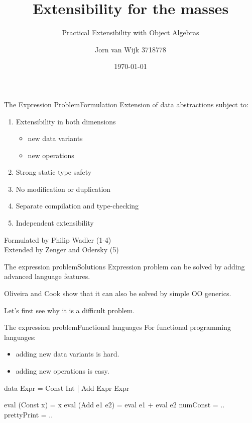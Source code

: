 \documentclass[10pt, compress]{beamer}
\title{Extensibility for the masses}
\subtitle{Practical Extensibility with Object Algebras}
\date{\today}
\author{Jorn van Wijk 3718778}
\institute{Universiteit Utrecht}
\newenvironment{slide}[1]{\begin{frame}[fragile,environment=slide]{#1}}{\end{frame}}
\newenvironment{slide}[2]{\begin{frame}[fragile,environment=slide]{#1}{#2}}{\end{frame}}
\begin{document}
\maketitle
\begin{slide}{The Expression Problem}{Formulation}
Extension of data abstractions subject to:
\begin{enumerate}
\item Extensibility in both dimensions 
	\begin{itemize}
		\item new data variants
		\item new operations
	\end{itemize}
\item Strong static type safety %
\item No modification or duplication
\item Separate compilation and type-checking
\item Independent extensibility
\end{enumerate}

Formulated by Philip Wadler (1-4)\\
Extended by Zenger and Odersky (5)
\end{slide}


\begin{slide}{The expression problem}{Solutions}
Expression problem can be solved by adding advanced language features.

Oliveira and Cook show that it can also be solved by simple OO generics.

Let's first see why it is a difficult problem.

\end{slide}


\begin{slide}{The expression problem}{Functional languages}
For functional programming languages: 
\begin{itemize}
\item adding new data variants is hard.
\item adding new operations is easy.
\end{itemize}
\begin{haskell}
data Expr = Const Int
          | Add Expr Expr
		  
eval (Const x) = x
eval (Add e1 e2) = eval e1 + eval e2
numConst = ..
prettyPrint = ..
\end{haskell}
\end{slide}
\end{document}
